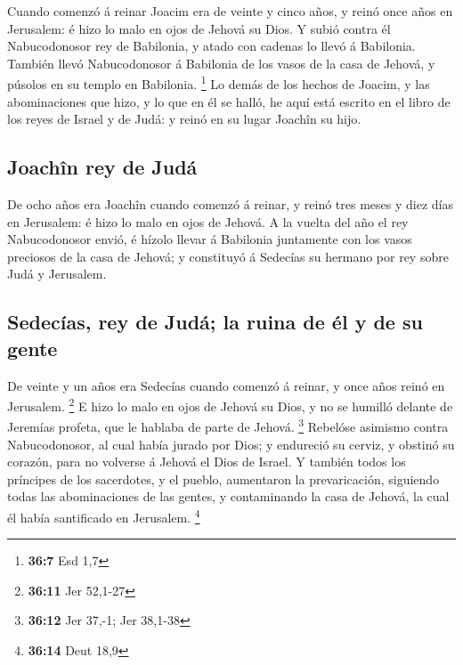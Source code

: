  Cuando comenzó á reinar Joacim era de veinte y cinco
años, y reinó once años en Jerusalem: é hizo lo malo en ojos de Jehová
su Dios.  Y subió contra él Nabucodonosor rey de
Babilonia, y atado con cadenas lo llevó á Babilonia. 
También llevó Nabucodonosor á Babilonia de los vasos de la casa de
Jehová, y púsolos en su templo en Babilonia. \footnote{\textbf{36:7} Esd
  1,7}  Lo demás de los hechos de Joacim, y las
abominaciones que hizo, y lo que en él se halló, he aquí está escrito en
el libro de los reyes de Israel y de Judá: y reinó en su lugar Joachîn
su hijo.

\hypertarget{joachuxeen-rey-de-juduxe1}{%
\subsection{Joachîn rey de Judá}\label{joachuxeen-rey-de-juduxe1}}

 De ocho años era Joachîn cuando comenzó á reinar, y reinó
tres meses y diez días en Jerusalem: é hizo lo malo en ojos de Jehová.
 A la vuelta del año el rey Nabucodonosor envió, é hízolo
llevar á Babilonia juntamente con los vasos preciosos de la casa de
Jehová; y constituyó á Sedecías su hermano por rey sobre Judá y
Jerusalem.

\hypertarget{sedecuxedas-rey-de-juduxe1-la-ruina-de-uxe9l-y-de-su-gente}{%
\subsection{Sedecías, rey de Judá; la ruina de él y de su
gente}\label{sedecuxedas-rey-de-juduxe1-la-ruina-de-uxe9l-y-de-su-gente}}

 De veinte y un años era Sedecías cuando comenzó á
reinar, y once años reinó en Jerusalem. \footnote{\textbf{36:11} Jer
  52,1-27}  E hizo lo malo en ojos de Jehová su Dios, y
no se humilló delante de Jeremías profeta, que le hablaba de parte de
Jehová. \footnote{\textbf{36:12} Jer 37,-1; Jer 38,1-38} 
Rebelóse asimismo contra Nabucodonosor, al cual había jurado por Dios; y
endureció su cerviz, y obstinó su corazón, para no volverse á Jehová el
Dios de Israel.  Y también todos los príncipes de los
sacerdotes, y el pueblo, aumentaron la prevaricación, siguiendo todas
las abominaciones de las gentes, y contaminando la casa de Jehová, la
cual él había santificado en Jerusalem. \footnote{\textbf{36:14} Deut
  18,9}

